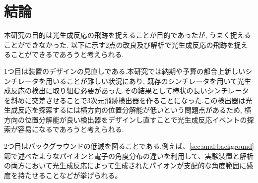 \chapter{結論}\label{cha:conclusion}
本研究の目的は光生成反応の飛跡を捉えることが目的であったが, うまく捉えることができなかった.
以下に示す2点の改良及び解析で光生成反応の飛跡を捉えることができるであろうと考えられる.

1つ目は装置のデザインの見直しである.本研究では納期や予算の都合上新しいシンチレータを用いることが難しい状況にあり, 既存のシンチレータを用いて光生成反応の検出に取り組む必要があった.その結果として棒状の長いシンチレータを斜めに交差させることで3次元飛跡検出器を作ることになった.この検出器は光生成反応を探索するには横方向の位置分解能が低いという問題点があるため, 横方向の位置分解能が良い検出器をデザインし直すことで光生成反応イベントの探索が容易になるであろうと考えられる.

2つ目はバックグラウンドの低減を図ることである.例えば、\ref{sec:anal:background}節で述べたようなパイオンと電子の角度分布の違いを利用して、実験装置と解析の両方において光生成反応によって生成されたパイオンが支配的な角度範囲に感度を持たせることなどが挙げられる。